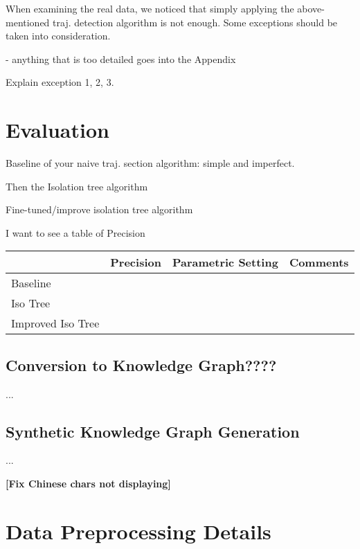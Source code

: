 \documentclass[runningheads]{llncs}
\newcommand{\matt}[1]{{\bf\color{green!50!black}[#1]}} %
\begin{document}
When examining the real data, we noticed that simply applying the above-mentioned traj. detection algorithm is not enough. Some exceptions should be taken into consideration. 

- anything that is too detailed goes into the Appendix

Explain exception 1, 2, 3.

\section{Evaluation}
\label{sec:evaluation}


Baseline of your naive traj. section algorithm: simple and imperfect. 

Then the Isolation tree algorithm 

Fine-tuned/improve isolation tree algorithm 

I want to see a table of Precision 

\begin{table}[]
\begin{tabular}{l|l|l|l}
                  & Precision & Parametric Setting & Comments \\ \hline
Baseline          &           &                    &          \\
Iso Tree          &           &                    &          \\
Improved Iso Tree &           &                    &         
\end{tabular}
\end{table}



\subsection{Conversion to Knowledge Graph????}
...

\subsection{Synthetic Knowledge Graph Generation}
...






\newpage
%
%




\matt{Fix Chinese chars not displaying}


\appendix
\section{Data Preprocessing Details}
\label{sec:preprocessing-appendix}
\end{document}
